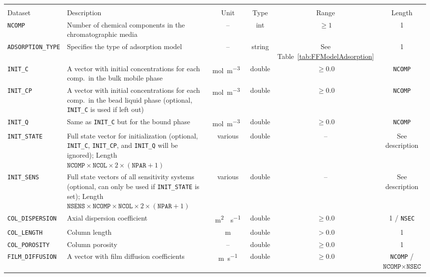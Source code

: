 \begin{table}[!ht]
\footnotesize
\begin{tabu}to \linewidth[m]{lX[m]cccc} \toprule
{} \\
\rowfont[c]\normalfont Dataset & Description & Unit & Type & Range & Length \everyrow{\midrule}\\
\texttt{NCOMP}& Number of chemical components in the chromatographic media & -- & int  & $\geq 1$ & 1 \\
\texttt{ADSORPTION\_TYPE} & Specifies the type of adsorption model & -- & string & See Table~\ref{tab:FFModelAdsorption} & 1 \\
\texttt{INIT\_C} & A vector with initial concentrations for each comp.\ in the bulk mobile phase & \si{\mol\per\cubic\metre{}} & double & $\geq 0.0$ & \texttt{NCOMP}\\
\texttt{INIT\_CP} & A vector with initial concentrations for each comp.\ in the bead liquid phase (optional, \texttt{INIT\_C} is used if left out) & \si{\mol\per\cubic\metre{}} & double & $\geq 0.0$ & \texttt{NCOMP}\\
\texttt{INIT\_Q} & Same as \texttt{INIT\_C} but for the bound phase & \si{\mol\per\cubic\metre{}} & double & $\geq 0.0$ & \texttt{NCOMP}\\
\texttt{INIT\_STATE} & Full state vector for initialization (optional, \texttt{INIT\_C}, \texttt{INIT\_CP}, and \texttt{INIT\_Q} will be ignored); Length $\texttt{NCOMP} \times \texttt{NCOL} \times 2 \times \left( \texttt{NPAR} + 1 \right)$ & various & double & -- & See description \\
\texttt{INIT\_SENS} & Full state vectors of all sensitivity systems (optional, can only be used if \texttt{INIT\_STATE} is set); Length $\texttt{NSENS} \times \texttt{NCOMP} \times \texttt{NCOL} \times 2 \times \left( \texttt{NPAR} + 1 \right)$ & various & double & -- & See description \\
\texttt{COL\_DISPERSION} & Axial dispersion coefficient & \si{\square\metre{}\per\second} & double & $\geq 0.0$ & 1 / \texttt{NSEC}\\
\texttt{COL\_LENGTH} & Column length & \si{\metre} & double & $> 0.0$ & 1\\
\texttt{COL\_POROSITY} & Column porosity & -- & double & $\geq 0.0$ & 1\\
\texttt{FILM\_DIFFUSION} & A vector with film diffusion coefficients & \si{\metre\per\second} & double & $\geq 0.0$ & \texttt{NCOMP} / {$\texttt{NCOMP} \times \texttt{NSEC}$}\\

\end{tabu}
\end{table}
